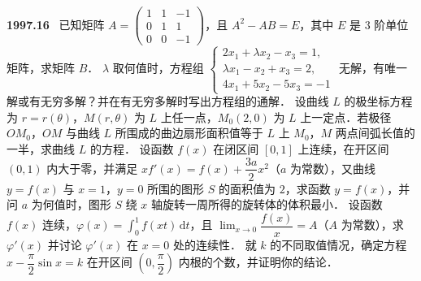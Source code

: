 \documentclass[UTF8,12pt]{ctexart}
\newcommand{\qn}[1]{\textbf{\large #1}\ }
\begin{document}
\vfill
\newpage
\qn{1997.16}
已知矩阵 $A=\begin{pmatrix} 1 & 1 & -1\\ 0 & 1 & 1\\ 0 & 0 & -1 \end{pmatrix}$，且 $A^2-AB=E$，其中 $E$ 是 $3$ 阶单位矩阵，求矩阵 $B$．
$\lambda$ 取何值时，方程组 $\begin{cases} 2x_1+\lambda x_2-x_3=1,\\ \lambda x_1-x_2+x_3=2,\\ 4x_1+5x_2-5x_3=-1 \end{cases}$ 无解，有唯一解或有无穷多解？并在有无穷多解时写出方程组的通解．
设曲线 $L$ 的极坐标方程为 $r=r(\theta)$，$M(r,\theta)$ 为 $L$ 上任一点，$M_0(2,0)$ 为 $L$ 上一定点．若极径 $OM_0$，$OM$ 与曲线 $L$ 所围成的曲边扇形面积值等于 $L$ 上 $M_0$，$M$ 两点间弧长值的一半，求曲线 $L$ 的方程．
设函数 $f(x)$ 在闭区间 $[0,1]$ 上连续，在开区间 $(0,1)$ 内大于零，并满足 $xf'(x)=f(x)+\dfrac{3a}{2}x^2$（$a$ 为常数），又曲线 $y=f(x)$ 与 $x=1$，$y=0$ 所围的图形 $S$ 的面积值为 $2$，求函数 $y=f(x)$，并问 $a$ 为何值时，图形 $S$ 绕 $x$ 轴旋转一周所得的旋转体的体积最小．
设函数 $f(x)$ 连续，$\varphi(x)=\displaystyle\int_0^1 f(xt)\,\mathrm{d}t$，且 $\lim_{x\to 0}\dfrac{f(x)}{x}=A$（$A$ 为常数），求 $\varphi'(x)$ 并讨论 $\varphi'(x)$ 在 $x=0$ 处的连续性．
就 $k$ 的不同取值情况，确定方程 $x-\dfrac{\pi}{2}\sin x=k$ 在开区间 $\left(0,\dfrac{\pi}{2}\right)$ 内根的个数，并证明你的结论．

\vfill
\newpage
\end{document}
